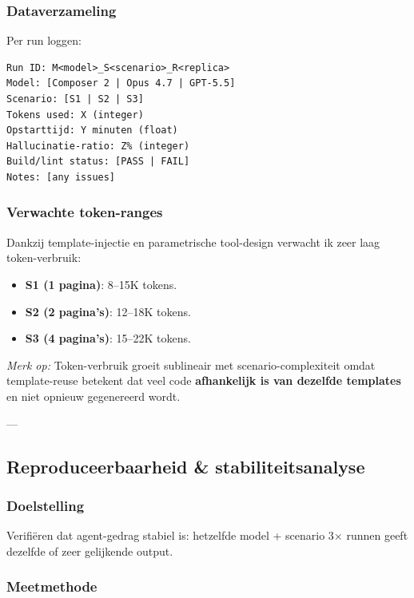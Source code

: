 \subsubsection{Dataverzameling}

Per run loggen:
\begin{verbatim}
Run ID: M<model>_S<scenario>_R<replica>
Model: [Composer 2 | Opus 4.7 | GPT-5.5]
Scenario: [S1 | S2 | S3]
Tokens used: X (integer)
Opstarttijd: Y minuten (float)
Hallucinatie-ratio: Z% (integer)
Build/lint status: [PASS | FAIL]
Notes: [any issues]
\end{verbatim}

\subsubsection{Verwachte token-ranges}

\noindent
Dankzij template-injectie en parametrische tool-design verwacht ik zeer laag token-verbruik:

\begin{itemize}
  \item \textbf{S1 (1 pagina)}: 8--15K tokens.
  \item \textbf{S2 (2 pagina's)}: 12--18K tokens.
  \item \textbf{S3 (4 pagina's)}: 15--22K tokens.
\end{itemize}

\noindent
\textit{Merk op:} Token-verbruik groeit sublineair met scenario-complexiteit omdat template-reuse betekent dat veel code \textbf{afhankelijk is van dezelfde templates} en niet opnieuw gegenereerd wordt.

---

\subsection{Reproduceerbaarheid \& stabiliteitsanalyse}

\subsubsection{Doelstelling}

Verifiëren dat agent-gedrag stabiel is: hetzelfde model + scenario 3× runnen geeft dezelfde of zeer gelijkende output.

\subsubsection{Meetmethode}

